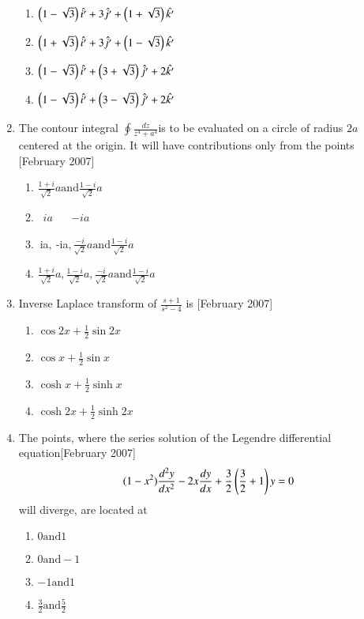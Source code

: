 \documentclass[journal]{IEEEtran}
\begin{document}
\begin{enumerate}
\begin{enumerate}
\item $\left(1-\sqrt{3}\right)\hat{i'} + 3\hat{j'} + \left(1+\sqrt{3}\right)\hat{k'}$
\item $\left(1+\sqrt{3}\right)\hat{i'} + 3\hat{j'} + \left(1-\sqrt{3}\right)\hat{k'}$
\item $\left(1-\sqrt{3}\right)\hat{i'} + \left(3+\sqrt{3}\right)\hat{j'} + 2\hat{k'}$
\item $\left(1-\sqrt{3}\right)\hat{i'} + \left(3-\sqrt{3}\right)\hat{j'} + 2\hat{k'}$
\end{enumerate}
\item The contour integral  $\oint \frac{dz}{z^4 + a^4}$is to be evaluated on a circle of radius $2a$ centered at the origin. It will have contributions only from the points \hfill[February 2007]
\begin{enumerate}
\item $ \frac{1+i}{\sqrt{2}}a  \text{and}  \frac{1-i}{\sqrt{2}}a$

\item  \ $ia$ \  \ $-ia$
\item $ \ $ia$, \ $-ia$,  \frac{-i}{\sqrt{2}}a \text{and}  \frac{1-i}{\sqrt{2}}a$
\item $  \frac{1+i}{\sqrt{2}}a,  \frac{1-i}{\sqrt{2}}a,  \frac{-i}{\sqrt{2}}a  \text{and}  \frac{1-i}{\sqrt{2}}a$
\end{enumerate}
\item Inverse Laplace transform of \( \frac{s+1}{s^2 - 4}\) is \hfill[February 2007]
\begin{enumerate}
\item $ \cos 2x + \frac{1}{2}\sin 2x$
\item $ \cos x + \frac{1}{2}\sin x$

\item $\cosh x + \frac{1}{2}\sinh x$
\item $ \cosh 2x + \frac{1}{2}\sinh 2x$
\end{enumerate}
\item The points, where the series solution of the Legendre differential equation\hfill[February 2007]
\[
(1 - x^2)\frac{d^2 y}{dx^2} - 2x\frac{dy}{dx} + \frac{3}{2}\left(\frac{3}{2}+1\right)y = 0 
\]
will diverge, are located at
\begin{enumerate}
\item $  0 \text{and}  1$
\item $  0 \text{and} -1$
\item $ -1 \text{and}  1$
\item $ \frac{3}{2}  \text{and} \frac{5}{2} $
\end{enumerate}


\end{enumerate}
\end{document}
